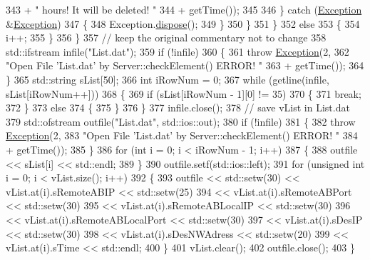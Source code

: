 \begin{DoxyCode}
343                                     + \textcolor{stringliteral}{" hours! It will be deleted! "}
344                                     + getTime());
345 
346                 \} \textcolor{keywordflow}{catch} (\hyperlink{classException}{Exception} &\hyperlink{classException}{Exception})
347                 \{
348                     Exception.\hyperlink{classException_ac84241265b4b5c7a38be1d729d26aa28}{dispose}();
349                 \}
350             \}
351         \}
352         \textcolor{keywordflow}{else}
353         \{
354             i++;
355         \}
356     \}
357     \textcolor{comment}{// keep the original commentary not to change}
358     std::ifstream infile(\textcolor{stringliteral}{"List.dat"});
359     \textcolor{keywordflow}{if} (!infile)
360     \{
361         \textcolor{keywordflow}{throw} \hyperlink{classException}{Exception}(2,
362                 \textcolor{stringliteral}{"Open File 'List.dat' by Server::checkElement() ERROR! "}
363                         + getTime());
364     \}
365     std::string sList[50];
366     \textcolor{keywordtype}{int} iRowNum = 0;
367     \textcolor{keywordflow}{while} (getline(infile, sList[iRowNum++]))
368     \{
369         \textcolor{keywordflow}{if} (sList[iRowNum - 1][0] != 35)
370         \{
371             \textcolor{keywordflow}{break};
372         \}
373         \textcolor{keywordflow}{else}
374         \{
375         \}
376     \}
377     infile.close();
378     \textcolor{comment}{// save vList in List.dat}
379     std::ofstream outfile(\textcolor{stringliteral}{"List.dat"}, std::ios::out);
380     \textcolor{keywordflow}{if} (!infile)
381     \{
382         \textcolor{keywordflow}{throw} \hyperlink{classException}{Exception}(2,
383                 \textcolor{stringliteral}{"Open File 'List.dat' by Server::checkElement() ERROR! "}
384                         + getTime());
385     \}
386     \textcolor{keywordflow}{for} (\textcolor{keywordtype}{int} i = 0; i < iRowNum - 1; i++)
387     \{
388         outfile << sList[i] << std::endl;
389     \}
390     outfile.setf(std::ios::left);
391     \textcolor{keywordflow}{for} (\textcolor{keywordtype}{unsigned} \textcolor{keywordtype}{int} i = 0; i < vList.size(); i++)
392     \{
393         outfile << std::setw(30) << vList.at(i).sRemoteABIP << std::setw(25)
394                 << vList.at(i).sRemoteABPort << std::setw(30)
395                 << vList.at(i).sRemoteABLocalIP << std::setw(30)
396                 << vList.at(i).sRemoteABLocalPort << std::setw(30)
397                 << vList.at(i).sDesIP << std::setw(30)
398                 << vList.at(i).sDesNWAdress << std::setw(20)
399                 << vList.at(i).sTime << std::endl;
400     \}
401     vList.clear();
402     outfile.close();
403 \}
\end{DoxyCode}
